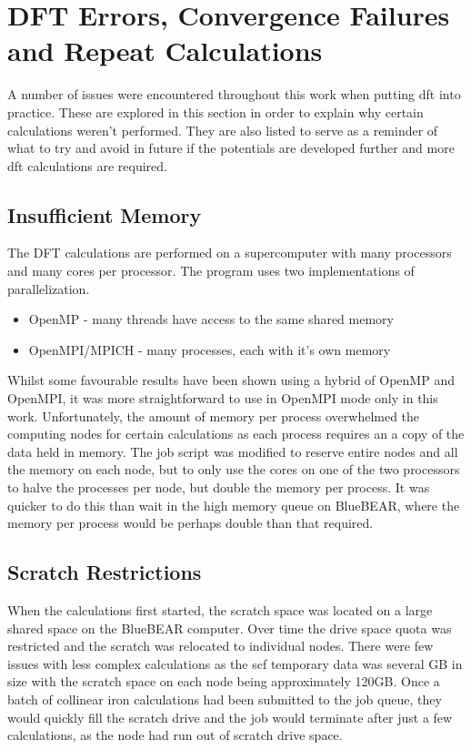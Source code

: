 
\FloatBarrier
\section[Issues to Overcome]{DFT Errors, Convergence Failures and Repeat Calculations}

A number of issues were encountered throughout this work when putting \acrshort{dft} into practice.  These are explored in this section in order to explain why certain calculations weren't performed.  They are also listed to serve as a reminder of what to try and avoid in future if the potentials are developed further and more \acrshort{dft} calculations are required.

\subsection{Insufficient Memory}

The DFT calculations are performed on a supercomputer with many processors and many cores per processor.  The program uses two implementations of parallelization.

\begin{itemize}
\item OpenMP - many threads have access to the same shared memory
\item OpenMPI/MPICH - many processes, each with it's own memory
\end{itemize}

Whilst some favourable results have been shown using a hybrid of OpenMP and OpenMPI, it was more straightforward to use in OpenMPI mode only in this work.  Unfortunately, the amount of memory per process overwhelmed the computing nodes for certain calculations as each process requires an a copy of the data held in memory.  The job script was modified to reserve entire nodes and all the memory on each node, but to only use the cores on one of the two processors to halve the processes per node, but double the memory per process.  It was quicker to do this than wait in the high memory queue on BlueBEAR, where the memory per process would be perhaps double than that required.

\subsection{Scratch Restrictions}

When the calculations first started, the scratch space was located on a large shared space on the BlueBEAR computer.  Over time the drive space quota was restricted and the scratch was relocated to individual nodes.  There were few issues with less complex calculations as the \acrshort{scf} temporary data was several GB in size with the scratch space on each node being approximately 120GB.  Once a batch of collinear iron calculations had been submitted to the job queue, they would quickly fill the scratch drive and the job would terminate after just a few calculations, as the node had run out of scratch drive space.


